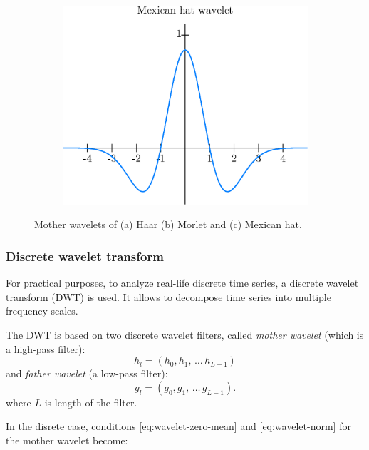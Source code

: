 \begin{figure}[h]
\begin{subfigure}{\minipagewidth}
		\caption{}
	\end{subfigure}
	\newline
	\begin{subfigure}{\minipagewidth}
		\centering
		\includegraphics[width=\textwidth]{figures/mexican.eps}
		\caption{}
	\end{subfigure}
	\caption{Mother wavelets of (a) Haar (b) Morlet and (c) Mexican hat.}
	\label{fig:wavelets}
\end{figure}

\subsubsection{Discrete wavelet transform}
For practical purposes, to analyze real-life discrete time series, a discrete wavelet transform (DWT) is used.
It allows to decompose time series into multiple frequency scales.

The DWT is based on two discrete wavelet filters, called \emph{mother wavelet}
(which is a high-pass filter):
\begin{equation}
h_l=(h_0, h_1, \, \ldots \, h_{L-1})
\end{equation}
and \emph{father wavelet} (a low-pass filter):
\begin{equation}
g_l=(g_0, g_1, \, \ldots \, g_{L-1}).
\end{equation}
where $L$ is length of the filter.

In the disrete case, conditions \ref{eq:wavelet-zero-mean} and \ref{eq:wavelet-norm} for the mother wavelet become:

